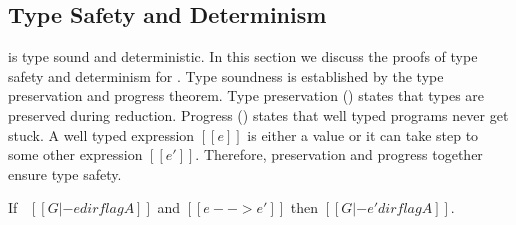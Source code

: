 \subsection{Type Safety and Determinism}
\label{sec:union:safety}
\cal is type sound and deterministic. In this section we discuss the
proofs of type safety and determinism for \cal. Type soundness is established
by the type preservation and progress
theorem. Type preservation () states that
types are preserved during reduction. Progress
() states that well typed programs never get
stuck.  A well typed expression $[[e]]$ is either a value or it can
take step to some other expression $[[e']]$. Therefore, preservation and progress
together ensure type safety.

\begin{theorem}
\label{lemma:union:preservation}
  If \ $[[G |- e dirflag A]]$ and $[[e --> e']]$ then $[[G |- e' dirflag A]]$.
\end{theorem}

\begin{comment}
\begin{proof}
  By induction on typing relation and subsequent inverting reduction relation.
  \begin{itemize}
    \item Cases \rref{typ-int, typ-var, typ-sub, typ-abs} are trivial to prove.
    \item Case \rref{typ-ann} requires helping \cref{lemma:union:check-pexpr-ann}.
    \item Case \rref{typ-app} requires helping \cref{lemma:union:pexpr-check-sub}
          and substitution \cref{lemma:union:substitution} for beta reduction.
    \item Case \rref{typ-typeof} requires substitution \cref{lemma:union:substitution}.
  \end{itemize}
\end{proof}

\baber{ToDo: change name of helping lemmas.}

\begin{lemma}[check-pexpr-ann]
\label{lemma:union:check-pexpr-ann}
  If \ $[[G |- p:C <= A]]$ \ then \ $[[G |- p <= A]]$.
\end{lemma}

\begin{lemma}[pexpr-check-sub]
\label{lemma:union:pexpr-check-sub}
  If \ $[[G |- p <= A]]$ \ and \ $[[A <: B]]$ \ then \ $[[G |- p <= B]]$.
\end{lemma}
\end{comment}

